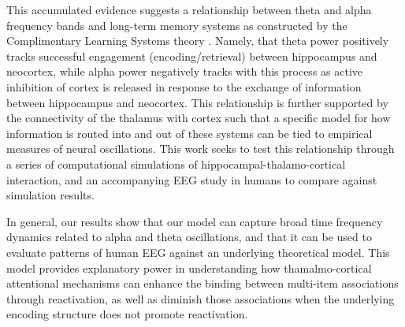 \documentclass[11pt, titlepage, twoside]{article}
\begin{document}
This accumulated evidence suggests a relationship between theta and alpha frequency bands and long-term memory systems as constructed by the Complimentary Learning Systems theory \cite{McClellandMcNaughtonOReilly95,OReillyBhattacharyyaHowardEtAl14}.  Namely, that theta power positively tracks successful engagement (encoding/retrieval) between hippocampus and neocortex, while alpha power negatively tracks with this process as active inhibition of cortex is released in response to the exchange of information between hippocampus and neocortex.  This relationship is further supported by the connectivity of the thalamus with cortex such that a specific model for how information is routed into and out of these systems can be tied to empirical measures of neural oscillations.  This work seeks to test this relationship through a series of computational simulations of hippocampal-thalamo-cortical interaction, and an accompanying EEG study in humans to compare against simulation results.

In general, our results show that our model can capture broad time frequency dynamics related to alpha and theta oscillations, and that it can be used to evaluate patterns of human EEG against an underlying theoretical model.  This model provides explanatory power in understanding how thamalmo-cortical attentional mechanisms can enhance the binding between multi-item associations through reactivation, as well as diminish those associations when the underlying encoding structure does not promote reactivation.  
\end{document}

